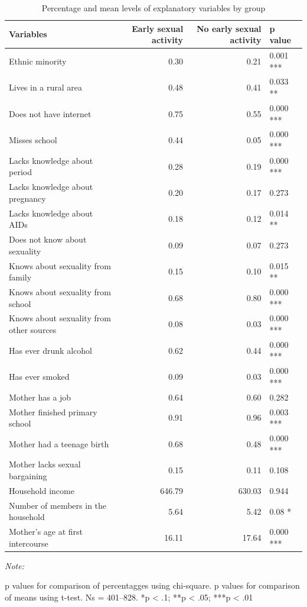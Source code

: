 \documentclass[
]{article}
\begin{document}
\begin{table}

\caption{\label{tab:unnamed-chunk-1}Percentage and mean levels of explanatory variables by group}
\centering
\begin{threeparttable}
\begin{tabular}[t]{lrrl}
\toprule
Variables & Early sexual activity & No early sexual activity & p value\\
\midrule
Ethnic minority & 0.30 & 0.21 & 0.001 ***\\
Lives in a rural area & 0.48 & 0.41 & 0.033 **\\
Does not have internet & 0.75 & 0.55 & 0.000 ***\\
Misses school & 0.44 & 0.05 & 0.000 ***\\
Lacks knowledge about period & 0.28 & 0.19 & 0.000 ***\\
\addlinespace
Lacks knowledge about pregnancy & 0.20 & 0.17 & 0.273\\
Lacks knowledge about AIDs & 0.18 & 0.12 & 0.014 **\\
Does not know about sexuality & 0.09 & 0.07 & 0.273\\
Knows about sexuality from family & 0.15 & 0.10 & 0.015 **\\
Knows about sexuality from school & 0.68 & 0.80 & 0.000 ***\\
\addlinespace
Knows about sexuality from other sources & 0.08 & 0.03 & 0.000 ***\\
Has ever drunk alcohol & 0.62 & 0.44 & 0.000 ***\\
Has ever smoked & 0.09 & 0.03 & 0.000 ***\\
Mother has a job & 0.64 & 0.60 & 0.282\\
Mother finished primary school & 0.91 & 0.96 & 0.003 ***\\
\addlinespace
Mother had a teenage birth & 0.68 & 0.48 & 0.000 ***\\
Mother lacks sexual bargaining & 0.15 & 0.11 & 0.108\\
Household income & 646.79 & 630.03 & 0.944\\
Number of members in the household & 5.64 & 5.42 & 0.08  *\\
Mother's age at first intercourse & 16.11 & 17.64 & 0.000 ***\\
\bottomrule
\end{tabular}
\begin{tablenotes}[para]
\item \textit{Note: } 
\item p values for comparison of percentagges using chi-square. p values for comparison of means using t-test. Ns = 401–828. *p < .1; **p < .05; ***p < .01
\end{tablenotes}
\end{threeparttable}
\end{table}
\end{document}
